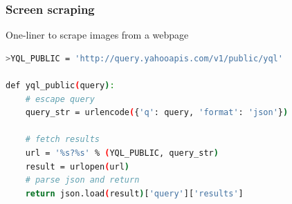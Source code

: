 \begin{frame}[fragile]
  \frametitle{Screen scraping}

    \begin{block}{One-liner to scrape images from a webpage}
        \begin{lstlisting}[language=bash]
>YQL_PUBLIC = 'http://query.yahooapis.com/v1/public/yql'

def yql_public(query):
    # escape query
    query_str = urlencode({'q': query, 'format': 'json'})

    # fetch results
    url = '%s?%s' % (YQL_PUBLIC, query_str)
    result = urlopen(url)
    # parse json and return
    return json.load(result)['query']['results']

        \end{lstlisting}
    \end{block}
\end{frame}
